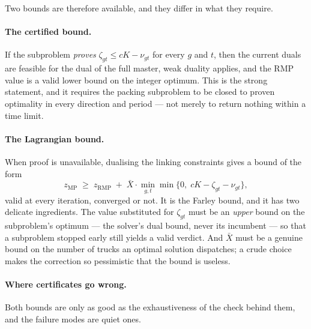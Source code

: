 \documentclass[11pt,a4paper]{article}
\begin{document}
Two bounds are therefore available, and they differ in what they require.

\paragraph{The certified bound.} If the subproblem \emph{proves}
$\zeta_{gt}\le cK-\nu_{gt}$ for every $g$ and $t$, then the current duals are
feasible for the dual of the full master, weak duality applies, and the RMP
value is a valid lower bound on the integer optimum. This is the strong
statement, and it requires the packing subproblem to be closed to proven
optimality in every direction and period --- not merely to return nothing within
a time limit.

\paragraph{The Lagrangian bound.} When proof is unavailable, dualising the
linking constraints gives a bound of the form
\[
  z_{\mathrm{MP}} \;\ge\; z_{\mathrm{RMP}} \;+\; \bar X\cdot
  \min_{g,t}\min\{0,\;cK-\zeta_{gt}-\nu_{gt}\},
\]
valid at every iteration, converged or not. It is the Farley bound, and it has
two delicate ingredients. The value substituted for $\zeta_{gt}$ must be an
\emph{upper} bound on the subproblem's optimum --- the solver's dual bound, never
its incumbent --- so that a subproblem stopped early still yields a valid
verdict. And $\bar X$ must be a genuine bound on the number of trucks an optimal
solution dispatches; a crude choice makes the correction so pessimistic that the
bound is useless.

\paragraph{Where certificates go wrong.} Both bounds are only as good as the
exhaustiveness of the check behind them, and the failure modes are quiet ones.
\end{document}
